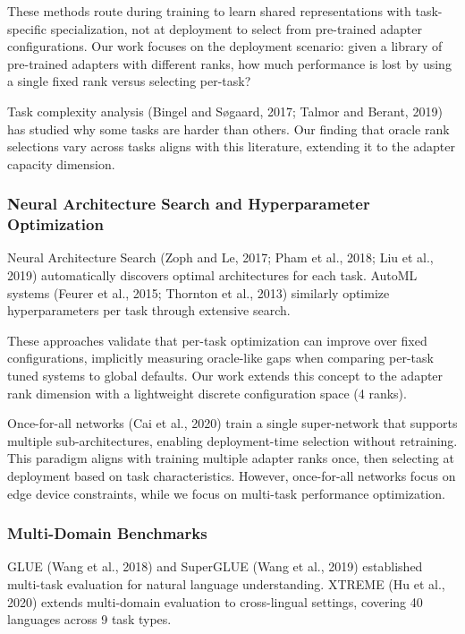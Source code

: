 These methods route during training to learn shared representations with task-specific specialization, not at deployment to select from pre-trained adapter configurations. Our work focuses on the deployment scenario: given a library of pre-trained adapters with different ranks, how much performance is lost by using a single fixed rank versus selecting per-task?

Task complexity analysis (Bingel and Søgaard, 2017; Talmor and Berant, 2019) has studied why some tasks are harder than others. Our finding that oracle rank selections vary across tasks aligns with this literature, extending it to the adapter capacity dimension.

\subsubsection{Neural Architecture Search and Hyperparameter Optimization}

Neural Architecture Search (Zoph and Le, 2017; Pham et al., 2018; Liu et al., 2019) automatically discovers optimal architectures for each task. AutoML systems (Feurer et al., 2015; Thornton et al., 2013) similarly optimize hyperparameters per task through extensive search.

These approaches validate that per-task optimization can improve over fixed configurations, implicitly measuring oracle-like gaps when comparing per-task tuned systems to global defaults. Our work extends this concept to the adapter rank dimension with a lightweight discrete configuration space (4 ranks).

Once-for-all networks (Cai et al., 2020) train a single super-network that supports multiple sub-architectures, enabling deployment-time selection without retraining. This paradigm aligns with training multiple adapter ranks once, then selecting at deployment based on task characteristics. However, once-for-all networks focus on edge device constraints, while we focus on multi-task performance optimization.

\subsubsection{Multi-Domain Benchmarks}

GLUE (Wang et al., 2018) and SuperGLUE (Wang et al., 2019) established multi-task evaluation for natural language understanding. XTREME (Hu et al., 2020) extends multi-domain evaluation to cross-lingual settings, covering 40 languages across 9 task types.

